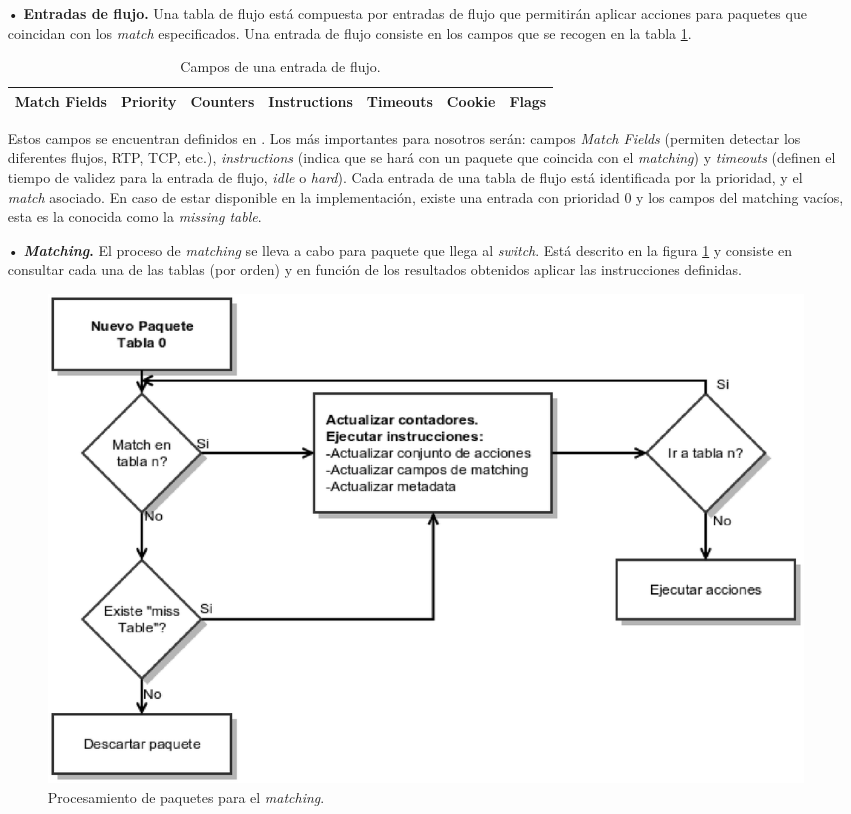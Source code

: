 \documentclass[a4paper,11pt]{book}
\begin{document}
\begin{itemize}
\item[•] \textbf{Entradas de flujo.} Una tabla de flujo está compuesta por entradas de flujo que permitirán aplicar acciones para paquetes que coincidan con los \textit{match} especificados. Una entrada de flujo consiste en los campos que se recogen en la tabla \ref{flowentrie}.

\begin{table}[tb]
\begin{center}
\begin{tabular}{|c|c|c|c|c|c|c|}
\hline 
Match Fields & Priority & Counters & Instructions & Timeouts & Cookie & Flags \\ 
\hline 
\end{tabular}
\end{center}
\caption[Campos de una entrada de flujo]{Campos de una entrada de flujo.}\label{flowentrie}
\end{table}

Estos campos se encuentran definidos en \cite{openflow13}. Los más importantes para nosotros serán: campos \textit{Match Fields} (permiten detectar los diferentes flujos, \ac{RTP}, \ac{TCP}, etc.), \textit{instructions} (indica que se hará con un paquete que coincida con el \textit{matching}) y \textit{timeouts} (definen el tiempo de validez para la entrada de flujo, \textit{idle} o \textit{hard}). Cada entrada de una tabla de flujo está identificada por la prioridad, y el \textit{match} asociado. En caso de estar disponible en la implementación, existe una entrada con prioridad 0 y los campos del matching vacíos, esta es la conocida como la \textit{missing table}.

\item[•] \textbf{\textit{Matching}.}\label{matching} El proceso de \textit{matching} se lleva a cabo para paquete que llega al \textit{switch}. Está descrito en la figura \ref{matchingProcess} y consiste en consultar cada una de las tablas (por orden) y en función de los resultados obtenidos aplicar las instrucciones definidas.

\begin{figure}[tb]
\centering
\includegraphics[scale=0.7]{./figuras/matching}
\caption[Proceso de \textit{matching}.]{Procesamiento de paquetes para el \textit{matching}.}\label{matchingProcess}
\end{figure}



\end{itemize}
\end{document}
